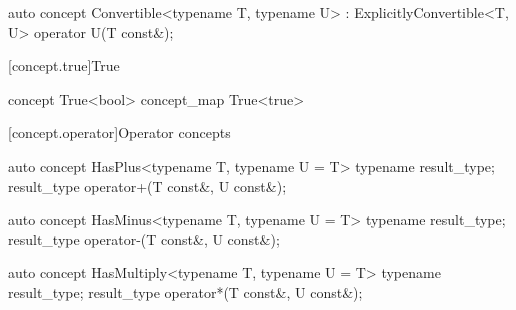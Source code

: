 \documentclass[american,twoside]{book}
\begin{document}
\begin{itemdecl}
auto concept Convertible<typename T, typename U> : ExplicitlyConvertible<T, U> {
  operator U(T const&);
}
\end{itemdecl}

\begin{itemdescr}
\pnum
{} 
\end{itemdescr}

[concept.true]{True}

\begin{itemdecl}
concept True<bool> { }
concept_map True<true> { }
\end{itemdecl}

\begin{itemdescr}
\pnum
{}

\pnum
{}
\end{itemdescr}

[concept.operator]{Operator concepts}
\begin{itemdecl}
auto concept HasPlus<typename T, typename U = T> {
  typename result_type;
  result_type operator+(T const&, U const&);
}
\end{itemdecl}

\begin{itemdescr}
\pnum
{}
\end{itemdescr}

\begin{itemdecl}
auto concept HasMinus<typename T, typename U = T> {
  typename result_type;
  result_type operator-(T const&, U const&);
}
\end{itemdecl}

\begin{itemdescr}
\pnum
{}
\end{itemdescr}

\begin{itemdecl}
auto concept HasMultiply<typename T, typename U = T> {
  typename result_type;
  result_type operator*(T const&, U const&);
}
\end{itemdecl}
\end{document}
